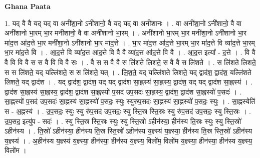 \documentclass[17pt]{extarticle}
\begin{document}
\textbf{Ghana Paata } \newline

1. यद् वै वै यद् यद् वा अनी॑शा॒नो ऽनी॑शानो॒ वै यद् यद् वा अनी॑शानः । . वा अनी॑शा॒नो ऽनी॑शानो॒ वै वा अनी॑शानो भा॒रम् भा॒र मनी॑शानो॒ वै वा अनी॑शानो भा॒रम् । . अनी॑शानो भा॒रम् भा॒र मनी॑शा॒नो ऽनी॑शानो भा॒र मा॑द॒त्त आ॑द॒त्ते भा॒र मनी॑शा॒नो ऽनी॑शानो भा॒र मा॑द॒त्ते । . भा॒र मा॑द॒त्त आ॑द॒त्ते भा॒रम् भा॒र मा॑द॒त्ते वि व्या॑द॒त्ते भा॒रम् भा॒र मा॑द॒त्ते वि । . आ॒द॒त्ते वि व्या॑द॒त्त आ॑द॒त्ते वि वै वै व्या॑द॒त्त आ॑द॒त्ते वि वै । . आ॒द॒त्त इत्या᳚ - द॒त्ते । . वि वै वै वि वि वै स स वै वि वि वै सः । . वै स स वै वै स लि॑शते लिशते॒ स वै वै स लि॑शते । . स लि॑शते लिशते॒ स स लि॑शते॒ यद् यल्लि॑शते॒ स स लि॑शते॒ यत् । . लि॒श॒ते॒ यद् यल्लि॑शते लिशते॒ यद् द्वाद॑श॒ द्वाद॑श॒ यल्लि॑शते लिशते॒ यद् द्वाद॑श । . यद् द्वाद॑श॒ द्वाद॑श॒ यद् यद् द्वाद॑श सा॒ह्नस्य॑ सा॒ह्नस्य॒ द्वाद॑श॒ यद् यद् द्वाद॑श सा॒ह्नस्य॑ । . द्वाद॑श सा॒ह्नस्य॑ सा॒ह्नस्य॒ द्वाद॑श॒ द्वाद॑श सा॒ह्नस्यो॑ प॒सद॑ उप॒सदः॑ सा॒ह्नस्य॒ द्वाद॑श॒ द्वाद॑श सा॒ह्नस्यो॑ प॒सदः॑ । . सा॒ह्नस्यो॑ प॒सद॑ उप॒सदः॑ सा॒ह्नस्य॑ सा॒ह्नस्यो॑ प॒सदः॒ स्युः स्युरु॑प॒सदः॑ सा॒ह्नस्य॑ सा॒ह्नस्यो॑ प॒सदः॒ स्युः । . सा॒ह्नस्येति॑ स - अ॒ह्नस्य॑ । . उ॒प॒सदः॒ स्युः स्यु रु॑प॒सद॑ उप॒सदः॒ स्यु स्ति॒स्र स्ति॒स्रः स्यु रु॑प॒सद॑ उप॒सदः॒ स्यु स्ति॒स्रः । . उ॒प॒सद॒ इत्यु॑प - सदः॑ । . स्यु स्ति॒स्र स्ति॒स्रः स्युः स्यु स्ति॒स्रो॑ ऽहीन॑स्या॒ हीन॑स्य ति॒स्रः स्युः स्यु स्ति॒स्रो॑ ऽहीन॑स्य । . ति॒स्रो॑ ऽहीन॑स्या॒ हीन॑स्य ति॒स्र स्ति॒स्रो॑ ऽहीन॑स्य य॒ज्ञ्स्य॑ य॒ज्ञ्स्या॒ हीन॑स्य ति॒स्र स्ति॒स्रो॑ ऽहीन॑स्य य॒ज्ञ्स्य॑ । . अ॒हीन॑स्य य॒ज्ञ्स्य॑ य॒ज्ञ्स्या॒ हीन॑स्या॒ हीन॑स्य य॒ज्ञ्स्य॒ विलो॑म॒ विलो॑म य॒ज्ञ्स्या॒ हीन॑स्या॒ हीन॑स्य य॒ज्ञ्स्य॒ विलो॑म । \newline
\end{document}
